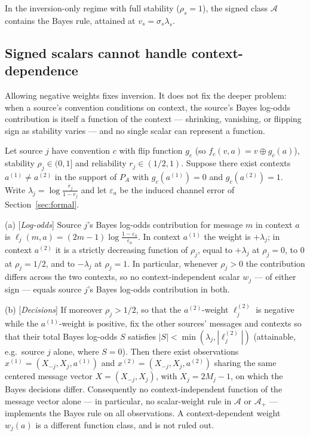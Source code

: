 \begin{corollary}
In the inversion-only regime with full stability ($\rho_s = 1$), the
signed class $\mathcal{A}$ contains the Bayes rule, attained at
$v_s = \sigma_s \lambda_s$.
\end{corollary}

\subsection{Signed scalars cannot handle context-dependence}

Allowing negative weights fixes inversion. It does not fix the deeper
problem: when a source's convention conditions on context, the source's
Bayes log-odds contribution is itself a function of the context ---
shrinking, vanishing, or flipping sign as stability varies --- and no
single scalar can represent a function.

\begin{theorem}
\label{thm:scalar}
Let source $j$ have convention $c$ with flip function $g_c$ (so
$f_c(v,a) = v \oplus g_c(a)$), stability $\rho_j \in (0,1]$ and
reliability $r_j \in (1/2,1)$. Suppose there exist contexts
$a^{(1)} \neq a^{(2)}$ in the support of $P_A$ with
$g_c(a^{(1)}) = 0$ and $g_c(a^{(2)}) = 1$. Write
$\lambda_j = \log\frac{r_j}{1-r_j}$ and let $\varepsilon_a$ be the
induced channel error of Section~\ref{sec:formal}.

(a) [\emph{Log-odds}] Source $j$'s Bayes log-odds contribution for
message $m$ in context $a$ is
$\ell_j(m,a) = (2m-1)\log\frac{1-\varepsilon_a}{\varepsilon_a}$.
In context $a^{(1)}$ the weight is $+\lambda_j$; in context $a^{(2)}$
it is a strictly decreasing function of $\rho_j$, equal to
$+\lambda_j$ at $\rho_j = 0$, to $0$ at $\rho_j = 1/2$, and to
$-\lambda_j$ at $\rho_j = 1$. In particular, whenever $\rho_j > 0$ the
contribution differs across the two contexts, so no
context-independent scalar $w_j$ --- of either sign --- equals source
$j$'s Bayes log-odds contribution in both.

(b) [\emph{Decisions}] If moreover $\rho_j > 1/2$, so that the
$a^{(2)}$-weight $\ell_j^{(2)}$ is negative while the
$a^{(1)}$-weight is positive, fix the other sources' messages and
contexts so that their total Bayes log-odds $S$ satisfies
$|S| < \min(\lambda_j, |\ell_j^{(2)}|)$ (attainable, e.g.\ source $j$
alone, where $S = 0$). Then there exist observations
$x^{(1)} = (X_{-j}, X_j, a^{(1)})$ and
$x^{(2)} = (X_{-j}, X_j, a^{(2)})$ sharing the same centered message
vector $X = (X_{-j}, X_j)$, with $X_j = 2M_j - 1$, on which the Bayes
decisions differ. Consequently no context-independent function of the
message vector alone --- in particular, no scalar-weight rule in
$\mathcal{A}$ or $\mathcal{A}_+$ --- implements the Bayes rule on all
observations. A context-dependent weight $w_j(a)$ is a different
function class, and is not ruled out.
\end{theorem}

